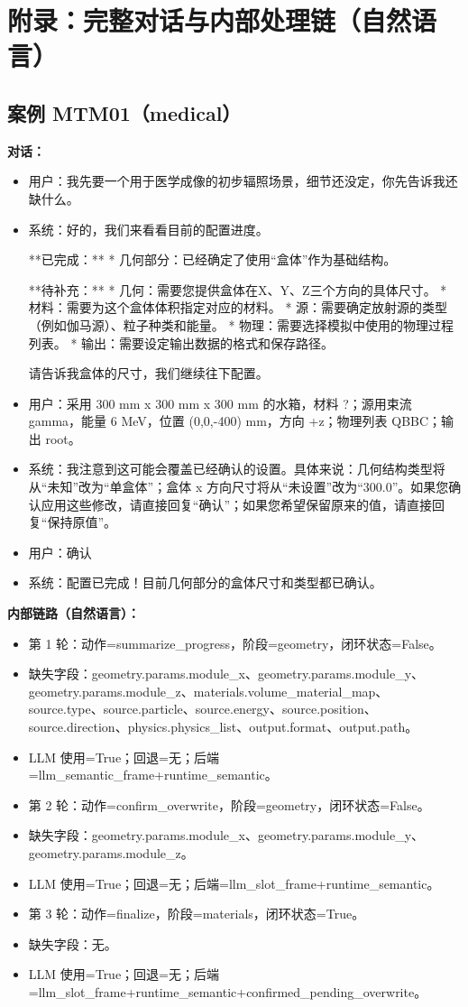 \documentclass[11pt]{ctexart}
\begin{document}
\section{附录：完整对话与内部处理链（自然语言）}
\subsection{案例 MTM01（medical）}
\textbf{对话：}
\begin{itemize}
\item 用户：我先要一个用于医学成像的初步辐照场景，细节还没定，你先告诉我还缺什么。
\item 系统：好的，我们来看看目前的配置进度。

**已完成：**
*   几何部分：已经确定了使用“盒体”作为基础结构。

**待补充：**
*   几何：需要您提供盒体在X、Y、Z三个方向的具体尺寸。
*   材料：需要为这个盒体体积指定对应的材料。
*   源：需要确定放射源的类型（例如伽马源）、粒子种类和能量。
*   物理：需要选择模拟中使用的物理过程列表。
*   输出：需要设定输出数据的格式和保存路径。

请告诉我盒体的尺寸，我们继续往下配置。
\item 用户：采用 300 mm x 300 mm x 300 mm 的水箱，材料 ?；源用束流 gamma，能量 6 MeV，位置 (0,0,-400) mm，方向 +z；物理列表 QBBC；输出 root。
\item 系统：我注意到这可能会覆盖已经确认的设置。具体来说：几何结构类型将从“未知”改为“单盒体”；盒体 x 方向尺寸将从“未设置”改为“300.0”。如果您确认应用这些修改，请直接回复“确认”；如果您希望保留原来的值，请直接回复“保持原值”。
\item 用户：确认
\item 系统：配置已完成！目前几何部分的盒体尺寸和类型都已确认。
\end{itemize}
\textbf{内部链路（自然语言）：}
\begin{itemize}
\item 第 1 轮：动作=summarize\_progress，阶段=geometry，闭环状态=False。
\item 缺失字段：geometry.params.module\_x、geometry.params.module\_y、geometry.params.module\_z、materials.volume\_material\_map、source.type、source.particle、source.energy、source.position、source.direction、physics.physics\_list、output.format、output.path。
\item LLM 使用=True；回退=无；后端=llm\_semantic\_frame+runtime\_semantic。
\item 第 2 轮：动作=confirm\_overwrite，阶段=geometry，闭环状态=False。
\item 缺失字段：geometry.params.module\_x、geometry.params.module\_y、geometry.params.module\_z。
\item LLM 使用=True；回退=无；后端=llm\_slot\_frame+runtime\_semantic。
\item 第 3 轮：动作=finalize，阶段=materials，闭环状态=True。
\item 缺失字段：无。
\item LLM 使用=True；回退=无；后端=llm\_slot\_frame+runtime\_semantic+confirmed\_pending\_overwrite。
\end{itemize}
\end{document}
